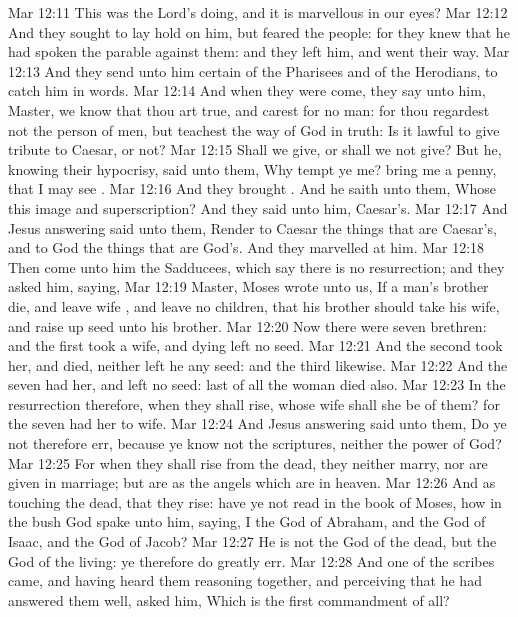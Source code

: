 \vs Mar 12:11 This was the Lord's doing, and it is marvellous in our eyes?
\vs Mar 12:12 And they sought to lay hold on him, but feared the people: for they knew that he had spoken the parable against them: and they left him, and went their way.
\vs Mar 12:13 And they send unto him certain of the Pharisees and of the Herodians, to catch him in  words.
\vs Mar 12:14 And when they were come, they say unto him, Master, we know that thou art true, and carest for no man: for thou regardest not the person of men, but teachest the way of God in truth: Is it lawful to give tribute to Caesar, or not?
\vs Mar 12:15 Shall we give, or shall we not give? But he, knowing their hypocrisy, said unto them, Why tempt ye me? bring me a penny, that I may see .
\vs Mar 12:16 And they brought . And he saith unto them, Whose  this image and superscription? And they said unto him, Caesar's.
\vs Mar 12:17 And Jesus answering said unto them, Render to Caesar the things that are Caesar's, and to God the things that are God's. And they marvelled at him.
\vs Mar 12:18 Then come unto him the Sadducees, which say there is no resurrection; and they asked him, saying,
\vs Mar 12:19 Master, Moses wrote unto us, If a man's brother die, and leave  wife , and leave no children, that his brother should take his wife, and raise up seed unto his brother.
\vs Mar 12:20 Now there were seven brethren: and the first took a wife, and dying left no seed.
\vs Mar 12:21 And the second took her, and died, neither left he any seed: and the third likewise.
\vs Mar 12:22 And the seven had her, and left no seed: last of all the woman died also.
\vs Mar 12:23 In the resurrection therefore, when they shall rise, whose wife shall she be of them? for the seven had her to wife.
\vs Mar 12:24 And Jesus answering said unto them, Do ye not therefore err, because ye know not the scriptures, neither the power of God?
\vs Mar 12:25 For when they shall rise from the dead, they neither marry, nor are given in marriage; but are as the angels which are in heaven.
\vs Mar 12:26 And as touching the dead, that they rise: have ye not read in the book of Moses, how in the bush God spake unto him, saying, I  the God of Abraham, and the God of Isaac, and the God of Jacob?
\vs Mar 12:27 He is not the God of the dead, but the God of the living: ye therefore do greatly err.
\vs Mar 12:28 And one of the scribes came, and having heard them reasoning together, and perceiving that he had answered them well, asked him, Which is the first commandment of all?
